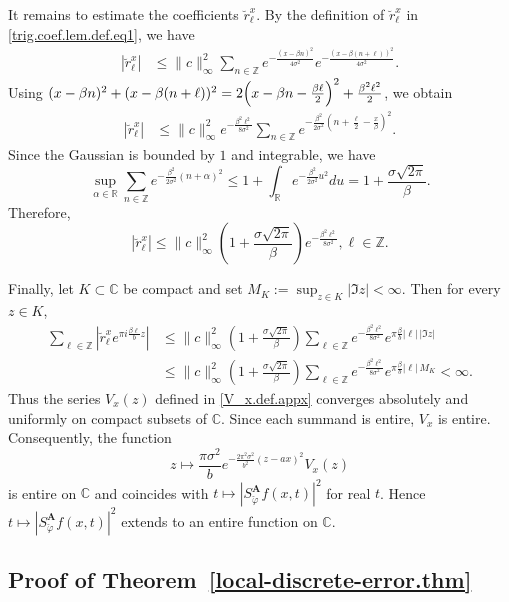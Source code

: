 \documentclass[11pt, reqno]{amsart}
\newcommand{\Z}{\mathbb{Z}}
\newcommand{\R}{\mathbb{R}}
\newcommand{\C}{\mathbb{C}}
\numberwithin{equation}{section}
\begin{document}
\begin{appendices}
It remains to estimate the coefficients $\breve r_\ell^x$. By the definition of  $\breve r_\ell^x$ in \eqref{trig.coef.lem.def.eq1}, we have 
\begin{align*}
|\breve r_\ell^x| &\le\|c\|_\infty^2 \sum_{n\in\Z}e^{-\frac{(x-\beta n)^2}{4\sigma^2}}e^{-\frac{(x-\beta(n+\ell))^2}{4\sigma^2}}.
\end{align*}
Using
$ (x-\beta n)^2+(x-\beta(n+\ell))^2 =
2\Bigl(x-\beta n-\frac{\beta\ell}{2}\Bigr)^2+\frac{\beta^2\ell^2}{2}$, 
we obtain
\begin{align*}
|\breve r_\ell^x| &\le \|c\|_\infty^2 e^{-\frac{\beta^2\ell^2}{8\sigma^2}}
\sum_{n\in\Z} e^{-\frac{\beta^2}{2\sigma^2}\left(n+\frac{\ell}{2}-\frac{x}{\beta}\right)^2}.
\end{align*}
Since the Gaussian is bounded by $1$ and integrable, we have
$$ \sup_{\alpha\in\R}\sum_{n\in\Z}e^{-\frac{\beta^2}{2\sigma^2}(n+\alpha)^2}
\le 1+\int_{\R}e^{-\frac{\beta^2}{2\sigma^2}u^2} du = 1+\frac{\sigma\sqrt{2\pi}}{\beta}.$$ 
Therefore,
$$ |\breve r_\ell^x| \le \|c\|_\infty^2 \left(1+\frac{\sigma\sqrt{2\pi}}{\beta}\right) e^{-\frac{\beta^2\ell^2}{8\sigma^2}}, \ell\in\Z.$$

Finally, let $K\subset\C$ be compact and set $
M_K:=\sup_{z\in K}|\Im z|<\infty$. 
Then for every $z\in K$,
\begin{align*}
\sum_{\ell\in\Z}\left|\breve r_\ell^x e^{\pi i\frac{\beta\ell}{b}z}\right|
&\le \|c\|_\infty^2 \left(1+\frac{\sigma\sqrt{2\pi}}{\beta}\right) \sum_{\ell\in\Z}
e^{-\frac{\beta^2\ell^2}{8\sigma^2}} e^{\pi \frac{\beta}{b}|\ell|\,|\Im z|} \\
&\le \|c\|_\infty^2 \left(1+\frac{\sigma\sqrt{2\pi}}{\beta}\right) \sum_{\ell\in\Z}
e^{-\frac{\beta^2\ell^2}{8\sigma^2}}e^{\pi \frac{\beta}{b}|\ell|\,M_K} <\infty.
\end{align*}
Thus the series  $V_x(z)$ defined in \eqref{V_x.def.appx} 
converges absolutely and uniformly on compact subsets of $\C$. Since each summand is entire, $V_x$ is entire. Consequently, the function
$$  z\longmapsto \frac{\pi\sigma^2}{b} e^{-\frac{2\pi^2\sigma^2}{b^2}(z-ax)^2} V_x(z)$$
is entire on $\C$ and coincides with
$ t\longmapsto |S_{\check{\varphi}}^{\mathbf A}f(x,t)|^2$ 
for real $t$. Hence $t\mapsto |S_{\check{\varphi}}^{\mathbf A}f(x,t)|^2$ extends to an entire function on $\C$.



\subsection{Proof of Theorem~\ref{local-discrete-error.thm}}\label{proof.local-discrete-error.thm}


\end{appendices}
\end{document}
